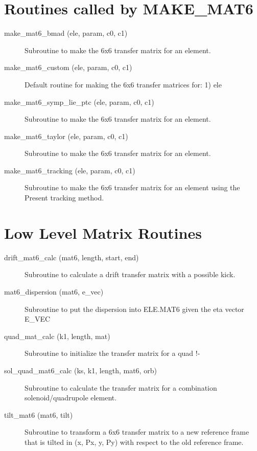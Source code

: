 \section{Routines called by MAKE\_MAT6}
\label{r:mat6}

\begin{description}

\item[make\_mat6\_bmad (ele, param, c0, c1)] \Newline
Subroutine to make the 6x6 transfer matrix for an element. 

\item[make\_mat6\_custom (ele, param, c0, c1)] \Newline
Default routine for making the 6x6 transfer matrices for: 1) ele%

\item[make\_mat6\_symp\_lie\_ptc (ele, param, c0, c1)] \Newline
Subroutine to make the 6x6 transfer matrix for an element. 

\item[make\_mat6\_taylor (ele, param, c0, c1)] \Newline
Subroutine to make the 6x6 transfer matrix for an element. 

\item[make\_mat6\_tracking (ele, param, c0, c1)] \Newline
Subroutine to make the 6x6 transfer matrix for an element using the Present tracking method. 

\end{description}

\section{Low Level Matrix Routines}
\label{r:low_mat}  

\begin{description}

\item[drift\_mat6\_calc (mat6, length, start, end)] \Newline
Subroutine to calculate a drift transfer matrix with a possible kick. 

\item[mat6\_dispersion (mat6, e\_vec)] \Newline
Subroutine to put the dispersion into ELE.MAT6 given the eta vector E\_VEC 

\item[quad\_mat\_calc (k1, length, mat)] \Newline
Subroutine to initialize the transfer matrix for a quad !- 

\item[sol\_quad\_mat6\_calc (ks, k1, length, mat6, orb)] \Newline
Subroutine to calculate the transfer matrix for a combination solenoid/quadrupole element. 

\item[tilt\_mat6 (mat6, tilt)] \Newline
Subroutine to transform a 6x6 transfer matrix to a new reference frame that is tilted in (x, Px, y, Py) with respect to the old reference frame. 

\end{description}

